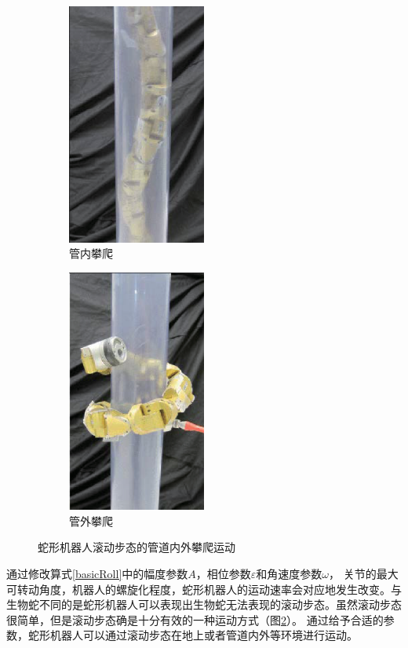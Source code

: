 \begin{figure}[h!] %
	\begin{subfigure}{0.5\textwidth}
		\centering
		\includegraphics[width=0.5\textwidth]{figure/chap03/pipecrawl.eps}
		\caption{管内攀爬}
		\label{fig:pipecrawl}
	\end{subfigure}
	\begin{subfigure}{0.5\textwidth}
		\centering
		\includegraphics[width=0.5\textwidth]{figure/chap03/poleclimb.eps}
		\caption{管外攀爬}
		\label{fig:poleclimb}
	\end{subfigure}
	\caption{蛇形机器人滚动步态的管道内外攀爬运动}
	\label{fig:polecc}
\end{figure}

通过修改算式\ref{basicRoll}中的幅度参数$A$，相位参数$\varepsilon$和角速度参数$\omega$， 关节的最大可转动角度，机器人的螺旋化程度，蛇形机器人的运动速率会对应地发生改变。与生物蛇不同的是蛇形机器人可以表现出生物蛇无法表现的滚动步态。虽然滚动步态很简单，但是滚动步态确是十分有效的一种运动方式（图\ref{fig:poleclimb}）。 通过给予合适的参数，蛇形机器人可以通过滚动步态在地上或者管道内外等环境进行运动。
